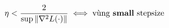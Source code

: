 \documentclass[preview]{standalone}
\begin{document}
\begin{align*}
\special{dvisvgm:raw <g id='unique000'>}\eta < \frac{2}{\sup\|\nabla^2 L(\cdot)\|} \special{dvisvgm:raw </g>}\special{dvisvgm:raw <g id='unique001'>}\;\Longleftrightarrow\; \special{dvisvgm:raw </g>}\special{dvisvgm:raw <g id='unique002'>}\text{vùng \textbf{small} stepsize}\special{dvisvgm:raw </g>}
\end{align*}
\end{document}
